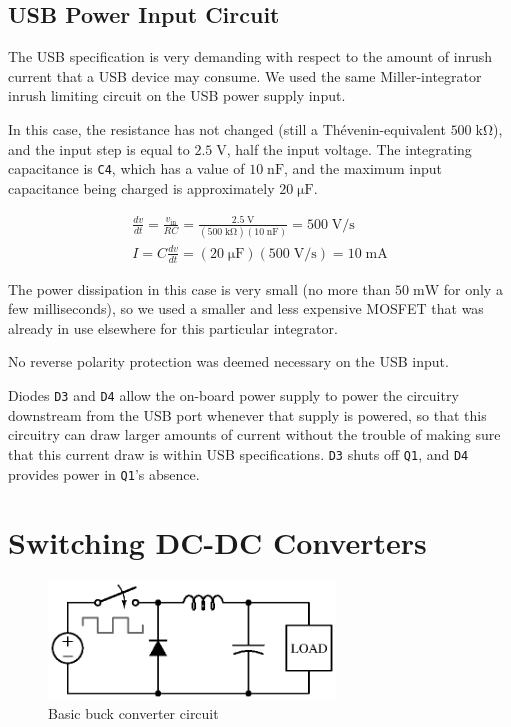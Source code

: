 \documentclass[article,oneside]{memoir}
\newcommand{\refdes}[1]{\texttt{#1}}
\newcommand{\mr}[1]{\ensuremath{\mathrm{#1}}}
\begin{document}
\begin{multicols}{2}
\subsection{USB Power Input Circuit}

The USB specification is very demanding with respect to the amount of inrush
current that a USB device may consume. We used the same Miller-integrator
inrush limiting circuit on the USB power supply input.

In this case, the resistance has not changed (still a Th\'evenin-equivalent
$500\;\mr{k\Omega}$), and the input step is equal to $2.5\;\mr{V}$, half the
input voltage. The integrating capacitance is \refdes{C4}, which has a value of $10\;\mr{nF}$,
and the maximum input capacitance being charged is approximately $20\;\mr{\mu F}$.

\begin{gather*}
    \frac{dv}{dt} = \frac{v_\mr{in}}{RC} = \frac{2.5\;\mr{V}}{(500\;\mr{k\Omega})(10\;\mr{nF})}
    = 500\;\mr{V/s} \\
    I = C \frac{dv}{dt} = (20\;\mr{\mu F})(500\;\mr{V/s}) = 10\;\mr{mA}
\end{gather*}

The power dissipation in this case is very small (no more than $50\;\mr{mW}$ for
only a few milliseconds), so we used a smaller and less expensive MOSFET that
was already in use elsewhere for this particular integrator.

No reverse polarity protection was deemed necessary on the USB input.

Diodes \refdes{D3} and \refdes{D4} allow the on-board power supply to power
the circuitry downstream from the USB port whenever that supply is powered,
so that this circuitry can draw larger amounts of current without the trouble
of making sure that this current draw is within USB specifications.
\refdes{D3} shuts off \refdes{Q1}, and \refdes{D4} provides power in
\refdes{Q1}'s absence.


\section{Switching DC-DC Converters}

\begin{figure}[H]
\centering
\includegraphics[width=3in]{buckconv}
\caption{Basic buck converter circuit}
\label{fig:basicbuck}
\end{figure}


\end{multicols}
\end{document}
